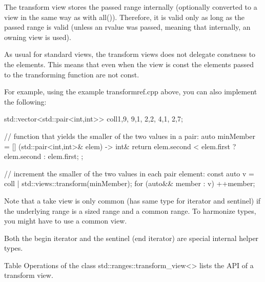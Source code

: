 The transform view stores the passed range internally (optionally converted to a view in the same way as with all()). Therefore, it is valid only as long as the passed range is valid (unless an rvalue was passed, meaning that internally, an owning view is used).


As usual for standard views, the transform views does not delegate constness to the elements. This means that even when the view is const the elements passed to the transforming function are not const.

For example, using the example transformref.cpp above, you can also implement the following:

\begin{cpp}
std::vector<std::pair<int,int>> coll{{1,9}, {9,1}, {2,2}, {4,1}, {2,7}};

// function that yields the smaller of the two values in a pair:
auto minMember = [] (std::pair<int,int>& elem) -> int& {
	return elem.second < elem.first ? elem.second : elem.first;
};

// increment the smaller of the two values in each pair element:
const auto v = coll | std::views::transform(minMember);
for (auto&& member : v) {
	++member;
}
\end{cpp}

Note that a take view is only common (has same type for iterator and sentinel) if the underlying range is a sized range and a common range. To harmonize types, you might have to use a common view.

Both the begin iterator and the sentinel (end iterator) are special internal helper types.


Table Operations of the class std::ranges::transform\_view<> lists the API of a transform view.

